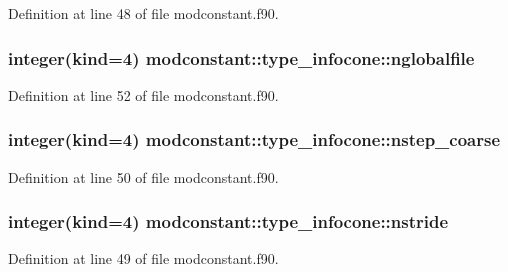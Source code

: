 Definition at line 48 of file modconstant.\+f90.

\subsubsection[{\texorpdfstring{nglobalfile}{nglobalfile}}]{\setlength{\rightskip}{0pt plus 5cm}integer(kind=4) modconstant\+::type\+\_\+infocone\+::nglobalfile}\hypertarget{structmodconstant_1_1type__infocone_a08b0aed7e8b71197bd6f73439a343883}{}\label{structmodconstant_1_1type__infocone_a08b0aed7e8b71197bd6f73439a343883}


Definition at line 52 of file modconstant.\+f90.

\subsubsection[{\texorpdfstring{nstep\+\_\+coarse}{nstep_coarse}}]{\setlength{\rightskip}{0pt plus 5cm}integer(kind=4) modconstant\+::type\+\_\+infocone\+::nstep\+\_\+coarse}\hypertarget{structmodconstant_1_1type__infocone_aa36e3d7e8b1cfd9a111b897917567ad5}{}\label{structmodconstant_1_1type__infocone_aa36e3d7e8b1cfd9a111b897917567ad5}


Definition at line 50 of file modconstant.\+f90.

\subsubsection[{\texorpdfstring{nstride}{nstride}}]{\setlength{\rightskip}{0pt plus 5cm}integer(kind=4) modconstant\+::type\+\_\+infocone\+::nstride}\hypertarget{structmodconstant_1_1type__infocone_a0518cd3191a67331de40dd13f19345b0}{}\label{structmodconstant_1_1type__infocone_a0518cd3191a67331de40dd13f19345b0}


Definition at line 49 of file modconstant.\+f90.

